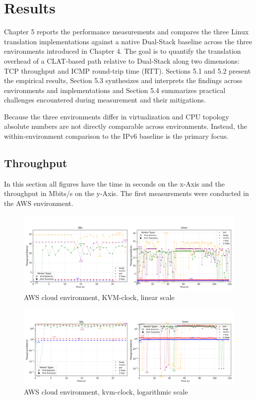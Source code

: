 \chapter{Results}
Chapter 5 reports the performance measurements and compares the three Linux translation implementations against a native Dual-Stack baseline across the three environments introduced in Chapter 4. The goal is to quantify the translation overhead of a CLAT-based path relative to Dual-Stack along two dimensions: TCP throughput and ICMP round-trip time (RTT). Sections 5.1 and 5.2 present the empirical results, Section 5.3 synthesizes and interprets the findings across environments and implementations and Section 5.4 summarizes practical challenges encountered during measurement and their mitigations.

Because the three environments differ in virtualization and CPU topology absolute numbers are not directly comparable across environments. Instead, the within-environment comparison to the IPv6 baseline is the primary focus. 

\section{Throughput}
In this section all figures have the time in seconds on the x-Axis and the throughput in Mbits/s on the y-Axis. The first measurements were conducted in the AWS environment.
\begin{figure}[H]
    \centering
    \includegraphics[width=1\textwidth]{resources/plots/CombinedPlot/TCP/AWS_tcp_sameScale_kvm-clock_linear.png}
    \caption{AWS cloud environment, KVM-clock, linear scale}
    \label{fig:AWS_tcp_sameScale_kvm-clock_linear}

\end{figure}
\begin{figure}[H]
    \centering
    \includegraphics[width=1\textwidth]{resources/plots/CombinedPlot/TCP/AWS_tcp_sameScale_kvm-clock_log.png}
    \caption{AWS cloud environment, kvm-clock, logarithmic scale}
    \label{fig:AWS_tcp_sameScale_kvm-clock_log}

\end{figure}


